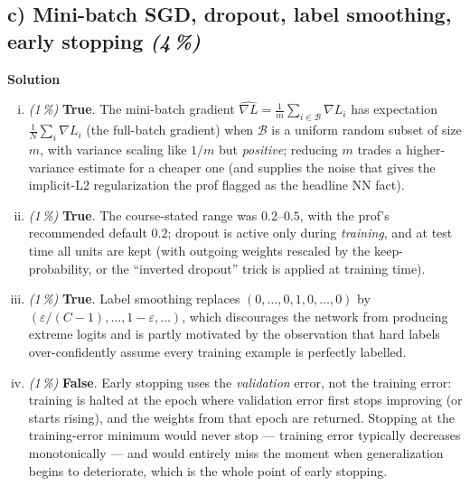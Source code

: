 \documentclass[11pt,a4paper]{article}
\newcommand{\subpoints}[1]{\textit{(#1\,\%)}}
\newcommand{\sol}{\noindent\textbf{Solution}}
\begin{document}
\subsection*{c) Mini-batch SGD, dropout, label smoothing, early stopping \subpoints{4}}
\sol{}
\begin{enumerate}[(i)]
  \item \subpoints{1} \textbf{True}. The mini-batch gradient $\widehat{\nabla L} =
        \tfrac{1}{m}\sum_{i\in\mathcal B}\nabla L_i$ has expectation
        $\tfrac{1}{N}\sum_i \nabla L_i$ (the full-batch gradient) when $\mathcal B$ is a uniform
        random subset of size $m$, with variance scaling like $1/m$ but \emph{positive}; reducing
        $m$ trades a higher-variance estimate for a cheaper one (and supplies the noise that gives
        the implicit-L2 regularization the prof flagged as the headline NN fact).
  \item \subpoints{1} \textbf{True}. The course-stated range was $0.2$--$0.5$, with the prof's
        recommended default $0.2$; dropout is active only during \emph{training}, and at test time
        all units are kept (with outgoing weights rescaled by the keep-probability, or the
        ``inverted dropout'' trick is applied at training time).
  \item \subpoints{1} \textbf{True}. Label smoothing replaces $(0,\dots,0,1,0,\dots,0)$ by
        $(\varepsilon/(C-1),\dots,1-\varepsilon,\dots)$, which discourages the network from
        producing extreme logits and is partly motivated by the observation that hard labels
        over-confidently assume every training example is perfectly labelled.
  \item \subpoints{1} \textbf{False}. Early stopping uses the \emph{validation} error, not the
        training error: training is halted at the epoch where validation error first stops
        improving (or starts rising), and the weights from that epoch are returned. Stopping at
        the training-error minimum would never stop --- training error typically decreases
        monotonically --- and would entirely miss the moment when generalization begins to
        deteriorate, which is the whole point of early stopping.
\end{enumerate}
\end{document}
